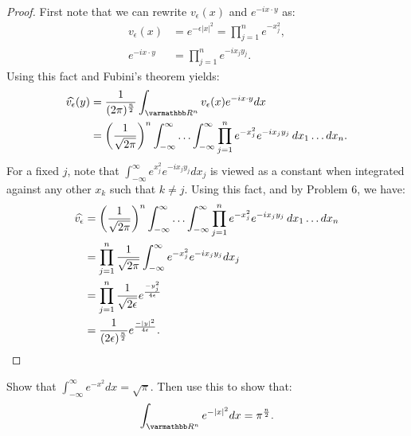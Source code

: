 \documentclass[10pt,oneside,openany]{memoir}
\begin{document}
	\begin{proof}
		First note that we can rewrite $v_\epsilon(x)$ and $e^{-i x \cdot y}$ as:
		\begin{align*}
			v_\epsilon(x) &= e^{-\epsilon|x|^2} = \prod_{j=1}^n e^{-x_j^2}, \\
			e^{-i x \cdot y} & = \prod_{j=1}^n e^{-ix_jy_j}.
		\end{align*}
		Using this fact and Fubini's theorem yields:
		\begin{align*}
			\widehat{v_\epsilon}(y)
			&= \frac{1}{(2\pi)^{\frac{n}{2}}}\int_{\bfR^n}^{} v_\epsilon(x)e^{-i x \cdot y}dx \\
			&= \left( \frac{1}{\sqrt{2\pi}} \right)^n \int_{-\infty}^{\infty} \ldots \int_{-\infty}^{\infty} \prod_{j=1}^n	e^{-x_j^2}e^{-i x_j y_j}\,dx_1\ldots dx_n.
		\end{align*}
		For a fixed $j$, note that $\int_{-\infty}^{\infty} e^{x_j^2}e^{-i x_j y_j}dx_j$ is viewed as a constant when integrated against any other $x_k$ such that $k \neq j$. Using this fact, and by Problem 6, we have:
		\begin{align*}
			\widehat{v_\epsilon}
			&=  \left( \frac{1}{\sqrt{2\pi}} \right)^n \int_{-\infty}^{\infty} \ldots \int_{-\infty}^{\infty} \prod_{j=1}^n	e^{-x_j^2}e^{-i x_j y_j}\,dx_1\ldots dx_n\\
			&= \prod_{j=1}^n \frac{1}{\sqrt{2\pi}}\int_{-\infty}^{\infty} e^{-x_j^2}e^{-i x_j y_j}dx_j \\
			&= \prod_{j=1}^n \frac{1}{\sqrt{2\epsilon}}e^{\frac{-y_j^2}{4\epsilon}} \\
			&= \frac{1}{(2\epsilon)^{\frac{n}{2}}}e^{\frac{-|y|^2}{4\epsilon}}. \qedhere
		\end{align*}
	\end{proof}
\begin{problem}
	Show that $\int_{-\infty}^{\infty} e^{-x^2}dx = \sqrt{\pi}$. Then use this to show that:
	\[
		\int_{\bfR^n}^{} e^{-|x|^2}dx = \pi^{\frac{n}{2}}.
	\] 
\end{problem}
\end{document}
